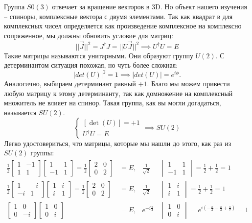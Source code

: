 Группа $S0(3)$ отвечает за вращение векторов в 3D. Но объект нашего изучения -- спиноры, комплексные вектора с двумя элементами. Так как квадрат в для комплексных чисел определяется как произведение комплексное на комплексно сопряженное, мы должны обновить условие для матриц:
\[
||\Vec{J}||^2 = J^{\dagger}J = ||U\Vec{J}||^2 \implies  U^{\dagger}U = E
\]
Такие матрицы называются унитарными. Они образуют группу $U(2)$. С детерминантом ситуация похожая, но чуть более сложная:
\[
|det(U)|^2 = 1 \implies |det(U)| = e^{i\phi}.
\]
Аналогично, выбираем детерминант равный $+1$. Благо мы можем привести любую матрицу к этому детерминанту, так как домножение на комплексный множитель не влияет на спинор. Такая группа, как вы могли догадаться, называется $SU(2)$.
\[
\begin{cases}
    [\det(U)] = +1\\
     U^{\dagger}U = E
\end{cases} \implies SU(2)
\]
Легко удостовериться, что матрицы, которые мы нашли до этого, как раз из $SU(2)$ группы:
\begin{align*}
    \frac{1}{2}\begin{bmatrix} 1 & -1 \\ 1 & 1 \end{bmatrix} \begin{bmatrix} 1 & 1 \\ -1 & 1 \end{bmatrix} = \frac{1}{2} \begin{bmatrix} 2 & 0 \\ 0 & 2 \end{bmatrix} &= E, & \frac{1}{\sqrt{2}}&\begin{vmatrix} 1 & 1\\ -1 & 1\end{vmatrix} = \frac{1}{2} + \frac{1}{2} = 1\\
    \frac{1}{2}\begin{bmatrix} 1 & -i \\ -i & 1 \end{bmatrix}\begin{bmatrix} 1 & i \\ i & 1 \end{bmatrix} = \frac{1}{2}\begin{bmatrix} 2 & 0 \\ 0 & 2 \end{bmatrix} &= E, & \frac{1}{\sqrt{2}}&\begin{vmatrix} 1 & i \\ i & 1 \end{vmatrix} = \frac{1}{2} + \frac{1}{2} = 1\\
    \begin{bmatrix} 1 & 0 \\ 0 & -i \end{bmatrix}\begin{bmatrix} 1 & 0 \\ 0 & i \end{bmatrix} &= E, & e^{-i\frac{\pi}{4}} &\begin{vmatrix} 1 & 0 \\ 0 & i \end{vmatrix} = e^{i(-\frac{\pi}{4} - \frac{\pi}{4} + \frac{\pi}{2})} = 1\\
\end{align*}
